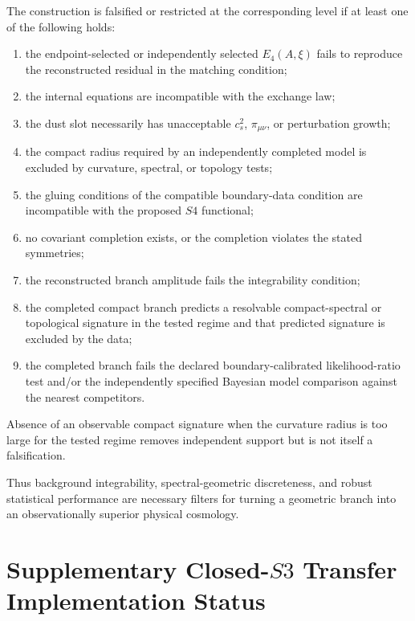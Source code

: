 \documentclass[11pt,a4paper]{article}
\def\Sthree{S3}%
\def\Sfour{S4}%
\numberwithin{equation}{section}
\theoremstyle{definition}
\theoremstyle{plain}
\theoremstyle{remark}
\newcommand{\Sthree}{S^3}
\newcommand{\Sfour}{S^4}
\newcommand{\Efour}{E_4}
\begin{document}
The construction is falsified or restricted at the corresponding level if at least one of the following holds:
\begin{enumerate}
\item the endpoint-selected or independently selected \(\Efour(A,\xi)\) fails to reproduce the reconstructed residual in the matching condition;
\item the internal equations are incompatible with the exchange law;
\item the dust slot necessarily has unacceptable \(c_s^2\), \(\pi_{\mu\nu}\), or perturbation growth;
\item the compact radius required by an independently completed model is excluded by curvature, spectral, or topology tests;
\item the gluing conditions of the compatible boundary-data condition are incompatible with the proposed \(\Sfour\) functional;
\item no covariant completion exists, or the completion violates the stated symmetries;
\item the reconstructed branch amplitude fails the integrability condition;
\item the completed compact branch predicts a resolvable compact-spectral or topological signature in the tested regime and that predicted signature is excluded by the data;
\item the completed branch fails the declared boundary-calibrated likelihood-ratio test and/or the independently specified Bayesian model comparison against the nearest competitors.
\end{enumerate}
Absence of an observable compact signature when the curvature radius is too large for the tested regime removes independent support but is not itself a falsification.

Thus background integrability, spectral-geometric discreteness, and robust statistical performance are necessary filters for turning a geometric branch into an observationally superior physical cosmology.



\section{Supplementary Closed-\texorpdfstring{$\Sthree$}{S3} Transfer Implementation Status}
\label{sec:numerical-transfer-package}
\end{document}
